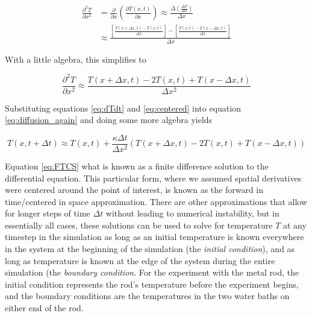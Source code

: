 \begin{equation} \label{eq:centered} 
\begin{split}
\frac{\partial^2 T}{\partial x^2}&= \frac{\partial }{\partial x}\left ( \frac{\partial T\left ( x,t \right )}{\partial x} \right )\approx \frac {\Delta\left ( \frac{\Delta T}{\Delta x} \right )}{\Delta x}
\\
&\approx \frac{\left [ \frac{T\left ( x+\Delta x,t \right )-T\left ( x,t \right )}{\Delta x} \right ]-\left [ \frac{T\left ( x,t \right )-T\left ( x-\Delta x,t \right )}{\Delta x} \right ]}{\Delta x}
\end{split}
\end{equation}

With a little algebra, this simplifies to 

\begin{equation} \label{eq:centered} 
\frac{\partial^2 T}{\partial x^2}\approx \frac{T\left ( x+\Delta x,t \right )-2T\left ( x,t \right )+T\left ( x-\Delta x,t \right )}{\Delta x^{2}}
\end{equation}

Substituting equations \ref{eq:dTdt} and \ref{eq:centered} into equation \ref{eq:diffusion_again} and doing some more algebra yields

\begin{equation} \label{eq:FTCS} 
T\!\left ( x,t\!+\!\Delta t \right ) \approx T\!\left ( x,t \right )+\frac{\kappa \Delta t}{\Delta x^{2}}\left ( T\!\left ( x\!+\!\Delta x\!,\!t \right ) -2T\!\left ( x,t \right )+T\!\left ( x\!-\!\Delta x,t \right )\right )
\end{equation}

Equation \ref{eq:FTCS} what is known as a finite difference solution to the differential equation. This particular form, where we assumed spatial derivatives were centered around the point of interest, is known as the forward in time/centered in space approximation. There are other approximations that allow for longer steps of time $\Delta t$ without leading to numerical instability, but in essentially all cases, these solutions can be used to solve for temperature $T$ at any timestep in the simulation as long as an initial temperature is known everywhere in the system at the beginning of the simulation (the \emph{initial condition}), and as long as temperature is known at the edge of the system during the entire simulation (the \emph{boundary condition}.  For the experiment with the metal rod, the initial condition represents the rod's temperature before the experiment begins, and the boundary conditions are the temperatures in the two water baths on either end of the rod.  

